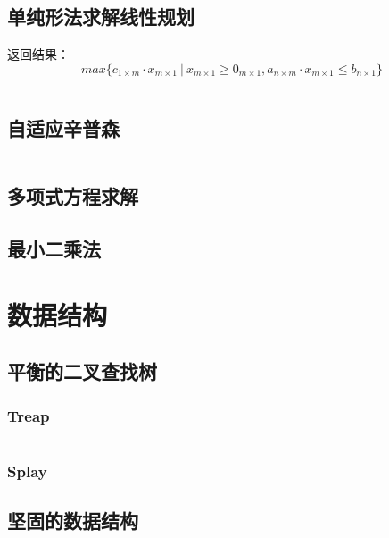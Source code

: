 \documentclass[a4paper]{article}
\newcommand{\cppcode}[1]{
    \inputminted[mathescape]{cpp}{source/#1}
}
\begin{document}
\cppcode{numerical-algorithm/fast-fourier-transform.cpp}

\subsection{单纯形法求解线性规划}

返回结果：$$max\{c_{1 \times m} \cdot x_{m \times 1} \ | \ x_{m \times 1} \geq 0_{m \times 1}, a_{n \times m} \cdot x_{m \times 1} \leq b_{n \times 1}\}$$

\cppcode{numerical-algorithm/linear-programming-simplex.cpp}

\subsection{自适应辛普森}

\cppcode{numerical-algorithm/adaptive-simpson.cpp}

\subsection{多项式方程求解}

\subsection{最小二乘法}

\section{数据结构}

\subsection{平衡的二叉查找树}

\subsubsection{Treap}

\cppcode{data-structure/treap.cpp}

\subsubsection{Splay}

\subsection{坚固的数据结构}
\end{document}
